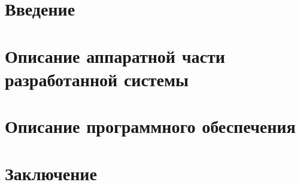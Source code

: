 \documentclass[a4paper,14pt]{extarticle}
\begin{document}
\begin{titlepage}

\end{titlepage}

\tableofcontents
\newpage 

\section{Введение}

\newpage  

\section{Описание аппаратной части разработанной системы}

\newpage

\section{Описание программного обеспечения}

\newpage

\section{Заключение}

\newpage


\end{document}
